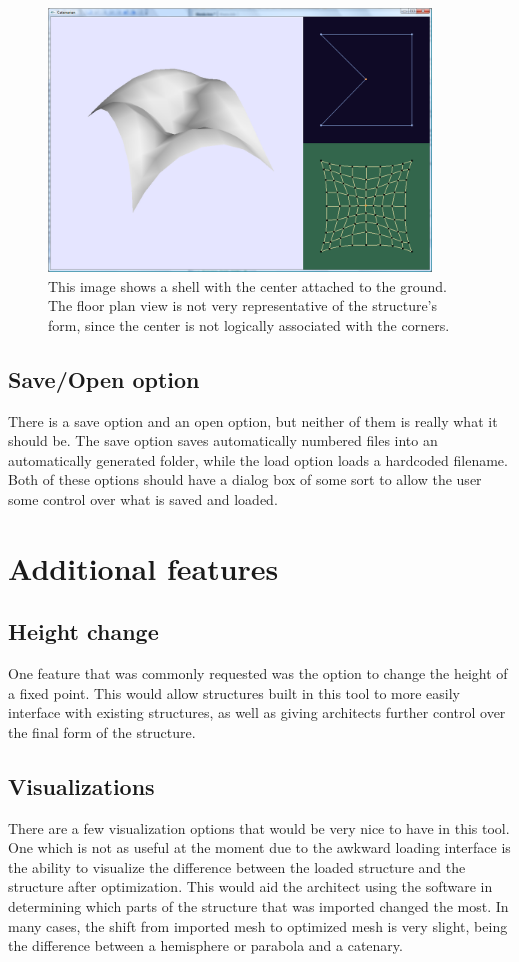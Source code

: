 \documentclass{thesis}
\begin{document}
\begin{figure}
\centering
\includegraphics[width=4in]{images/center_fixed.png}
\caption[A shell with the center fixed]{This image shows a shell with the center attached to the ground.  The floor plan view is
not very representative of the structure's form, since the center is not logically associated with the corners.}
\label{fig:compound_catenary}
\end{figure}

\subsection{Save/Open option}
There is a save option and an open option, but neither of them is really what it should be.  The save option saves automatically
numbered files into an automatically generated folder, while the load option loads a hardcoded filename.  Both of these options
should have a dialog box of some sort to allow the user some control over what is saved and loaded.

\section{Additional features}

\subsection{Height change}
One feature that was commonly requested was the option to change the height of a fixed point.  This would allow structures built
in this tool to more easily interface with existing structures, as well as giving architects further control over the final form
of the structure.

\subsection{Visualizations}
There are a few visualization options that would be very nice to have in this tool.  One which is not as useful at the moment due
to the awkward loading interface is the ability to visualize the difference between the loaded structure and the structure after
optimization.  This would aid the architect using the software in determining which parts of the structure that was imported
changed the most.  In many cases, the shift from imported mesh to optimized mesh is very slight, being the difference between
a hemisphere or parabola and a catenary.
\end{document}
